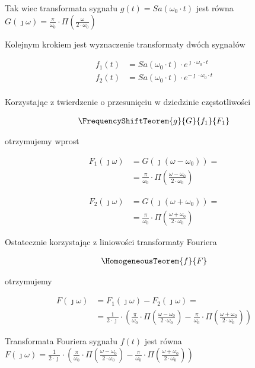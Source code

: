 \begin{task}
Tak wiec transformata sygnału $g(t)=Sa\left(\omega_0 \cdot t\right)$ jest równa $G(\jmath \omega)=\frac{\pi}{ \omega_0 } \cdot \Pi\left( \frac{\omega}{2\cdot \omega_0}\right)$

Kolejnym krokiem jest wyznaczenie transformaty dwóch sygnałów

\begin{align*}
f_1(t)&=Sa\left(\omega_0 \cdot t\right) \cdot e^{\jmath \cdot \omega_0 \cdot t}\\
f_2(t)&=Sa\left(\omega_0 \cdot t\right) \cdot e^{-\jmath \cdot \omega_0 \cdot t}\\
\end{align*}

Korzystając z twierdzenie o przesunięciu w dziedzinie częstotliwości

\begin{align*}
\FrequencyShiftTeorem{g}{G}{f_1}{F_1}
\end{align*}

otrzymujemy wprost

\begin{align*}
F_1(\jmath \omega)&=G\left(\jmath \left(\omega -\omega_0\right)\right)=\\
&=\frac{\pi}{ \omega_0 } \cdot \Pi\left( \frac{\omega - \omega_0}{2\cdot \omega_0}\right)
\end{align*}

\begin{align*}
F_2(\jmath \omega)&=G\left(\jmath \left(\omega +\omega_0\right)\right)=\\
&=\frac{\pi}{ \omega_0 } \cdot \Pi\left( \frac{\omega + \omega_0}{2\cdot \omega_0}\right)
\end{align*}

Ostatecznie korzystając z liniowości transformaty Fouriera

\begin{align*}
\HomogeneousTeorem{f}{F}
\end{align*}

otrzymujemy

\begin{align*}
F(\jmath \omega)&=F_1(\jmath \omega)-F_2(\jmath \omega)=\\
&=\frac{1}{2 \cdot \jmath} \cdot \left( \frac{\pi}{ \omega_0 } \cdot \Pi\left( \frac{\omega - \omega_0}{2\cdot \omega_0}\right) - \frac{\pi}{ \omega_0 } \cdot \Pi\left( \frac{\omega + \omega_0}{2\cdot \omega_0}\right) \right)
\end{align*}


Transformata Fouriera sygnału $f(t)$ jest równa $F(\jmath \omega)=\frac{1}{2 \cdot \jmath} \cdot \left( \frac{\pi}{ \omega_0 } \cdot \Pi\left( \frac{\omega - \omega_0}{2\cdot \omega_0}\right) - \frac{\pi}{ \omega_0 } \cdot \Pi\left( \frac{\omega + \omega_0}{2\cdot \omega_0}\right) \right)$

\end{task}


